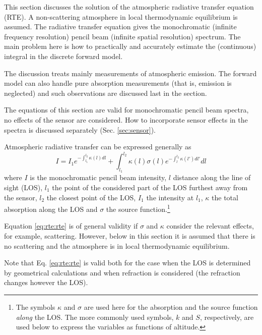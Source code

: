 %
%
This section discusses the solution of the atmospheric radiative
transfer equation (RTE). A non-scattering atmosphere in local
thermodynamic equilibrium is assumed. 
The radiative transfer equation gives the
monochromatic (infinite frequency resolution) pencil beam (infinite
spatial resolution) spectrum. The main problem here is
how to practically and accurately estimate the (continuous) integral
in the discrete forward model.
 
The discussion treats mainly measurements of atmospheric emission. The
forward model can also handle pure absorption measurements (that is,
emission is neglected) and such observations are discussed last in the
section.

The equations of this section are valid for monochromatic pencil beam
spectra, no effects of the sensor are considered. How to
incorporate sensor effects in the spectra is discussed separately
(Sec. \ref{sec:sensor}).



 \label{sec:rte:intro}
 
 Atmospheric radiative transfer can be expressed generally as
 \begin{equation}
   I = I_1e^{-\int_{l_1}^{l_2}{\kappa(l)dl}} +
        \int_{l_1}^{l_2}{\kappa(l)\sigma(l)e^{-\int_{l}^{l_2}{\kappa(l')dl'}}dl}
    \label{eq:rte:rte}
 \end{equation}
 where $I$ is the monochromatic pencil beam intensity, $l$ distance
 along the line of sight (LOS), $l_1$ the point of the considered part
 of the LOS furthest away from the sensor, $l_2$ the closest point of
 the LOS, $I_1$ the intensity at $l_1$, $\kappa$ the total absorption
 along the LOS and $\sigma$ the source function.\footnote{The symbols
   $\kappa$ and $\sigma$ are used here for the absorption and the source 
   function \emph{along} the LOS. The more commonly used symbols, $k$ and
   $S$, respectively, are used below to express the variables as
   functions of altitude.}
  
 Equation \ref{eq:rte:rte} is of general validity if $\sigma$ and $\kappa$
 consider the relevant effects, for example, scattering. However, below in
 this section it is assumed that there is no scattering and the
 atmosphere is in local thermodynamic equilibrium.
  
 Note that Eq. \ref{eq:rte:rte} is valid both for the case when the LOS is
 determined by geometrical calculations and when refraction is
 considered (the refraction changes however the LOS).
  
